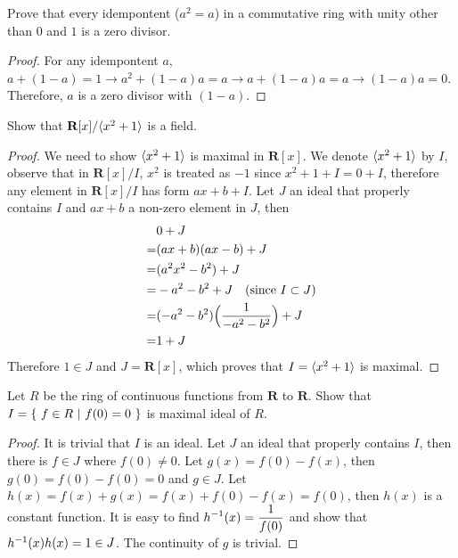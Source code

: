 \documentclass[../main.tex]{subfiles}
\begin{document}
\begin{exercise}
  Prove that every idempontent ($a^2 = a$) in a commutative ring with
  unity other than $0$ and $1$ is a zero divisor.
\end{exercise}
\begin{proof}
  For any idempontent $a$, 
  $a + (1 - a) = 1 \rightarrow a^2 + (1 - a)a = a \rightarrow a + (1 - a)a = a \rightarrow (1 - a)a = 0$.
  Therefore, $a$ is a zero divisor with $(1 - a)$.
\end{proof}

\begin{exercise}
  Show that $\textbf{R}[x]/\langle x^2 + 1 \rangle$ is a field.
\end{exercise}
\begin{proof}
  We need to show $\langle x^2 + 1 \rangle$ is maximal in $\textbf{R}[x]$.
  We denote $\langle x^2 + 1 \rangle$ by $I$,
  observe that in $\textbf{R}[x]/I$, 
  $x^2$ is treated as $-1$ since $x^2 + 1 + I = 0 + I$,
  therefore any element in $\textbf{R}[x]/I$ has form
  $ax + b + I$.
  Let $J$ an ideal that properly contains $I$ and
  $ax + b$ a non-zero element in $J$,
  then
  \begin{align*}
     & 0 + J \\
    =& (ax + b)(ax - b) + J \\
    =& (a^2x^2 - b^2) + J \\
    =& - a^2 - b^2 + J \quad \text{(since $I \subset J$)} \\
    =& (- a^2 - b^2)\Bigl( \frac{1}{- a^2 - b^2} \Bigr) + J \\
    =& 1 + J
  \end{align*}
  Therefore $1 \in J$ and $J = \textbf{R}[x]$, which proves that
  $I = \langle x^2 + 1 \rangle$ is maximal.
\end{proof}

\setcounter{exercise}{44}
\begin{exercise}
  Let $R$ be the ring of continuous functions from $\textbf{R}$ to $\textbf{R}$.
  Show that $I = \{ \ f \in R \ | \ f(0) = 0 \ \}$ is maximal ideal of $R$.
\end{exercise}
\begin{proof}
  It is trivial that $I$ is an ideal.
  Let $J$ an ideal that properly contains $I$, then there is
  $f \in J$ where $f(0) \neq 0$.
  Let $g(x) = f(0) - f(x)$, then $g(0) = f(0) - f(0) = 0$ and $g \in J$.
  Let $h(x) = f(x) + g(x) = f(x) + f(0) - f(x) = f(0)$,
  then $h(x)$ is a constant function.
  It is easy to find $\displaystyle h^{-1}(x) = \frac{1}{f(0)}$
  and show that $h^{-1}(x)h(x) = 1 \in J$.
  The continuity of $g$ is trivial.
\end{proof}
\end{document}
